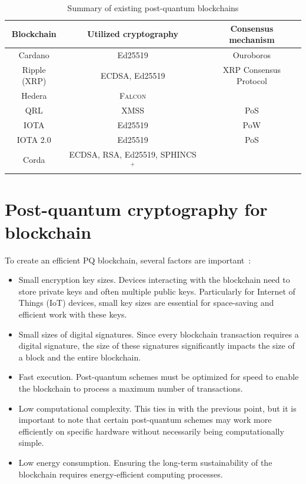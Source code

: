 \begin{table}[h]
    \centering
    \begin{tabular}[p]{| c | c | c |}    
        \hline
        \textbf{Blockchain} & \textbf{Utilized cryptography} & \textbf{Consensus mechanism}\\ \hline
        Cardano & \cellcolor{red!25} Ed25519 & \cellcolor{green!25} Ouroboros \\ 
        \hline
        Ripple (XRP) & \cellcolor{red!25} ECDSA, Ed25519 & \cellcolor{green!25} XRP Consensus Protocol\\ 
        \hline
        Hedera & \cellcolor{green!25} \textsc{Falcon} &  \\
        \hline
        QRL & \cellcolor{green!25} XMSS & \cellcolor{green!25} PoS \\
        \hline
        IOTA & \cellcolor{red!25} Ed25519 & \cellcolor{red!25} PoW \\
        \hline
        IOTA 2.0 & \cellcolor{red!25} Ed25519 & \cellcolor{green!25} PoS \\
        \hline
        Corda & \cellcolor{green!25} ECDSA, RSA, Ed25519, SPHINCS$^+$  & \\
        \hline
    \end{tabular}
    \caption{Summary of existing post-quantum blockchains}
    \label{tab:pq.blockchains.overview}
\end{table}


\section{Post-quantum cryptography for blockchain}
\label{sec:pq.crypto.for.bc}

To create an efficient PQ blockchain, several factors are important~\cite{pqc.towards.bc.8967098}:

\begin{itemize}
    \item Small encryption key sizes. Devices interacting with the blockchain need to store private keys and often multiple public keys. Particularly for Internet of Things (IoT) devices, small key sizes are essential for space-saving and efficient work with these keys.
    \item Small sizes of digital signatures. Since every blockchain transaction requires a digital signature, the size of these signatures significantly impacts the size of a block and the entire blockchain.
    \item Fast execution. Post-quantum schemes must be optimized for speed to enable the blockchain to process a maximum number of transactions.
    \item Low computational complexity. This ties in with the previous point, but it is important to note that certain post-quantum schemes may work more efficiently on specific hardware without necessarily being computationally simple.
    \item Low energy consumption. Ensuring the long-term sustainability of the blockchain requires energy-efficient computing processes.
\end{itemize}

